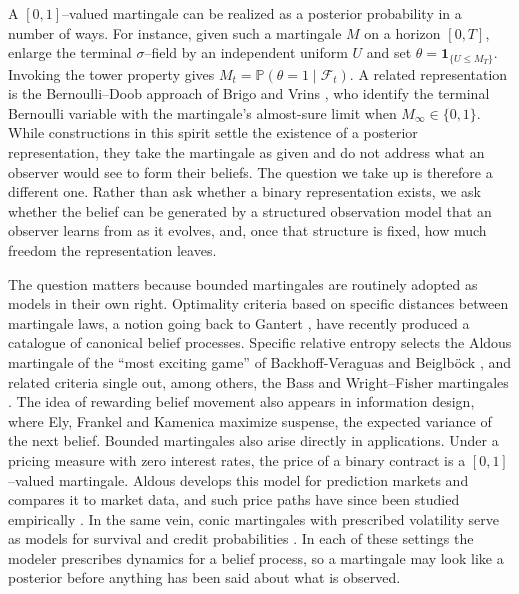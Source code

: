 \documentclass[11pt, reqno]{amsart}
\theoremstyle{plain}
\theoremstyle{remark}
\numberwithin{equation}{section}
\begin{document}
A $[0,1]$--valued martingale can be realized as a posterior probability in a number of ways. For instance, given such a martingale $M$ on a horizon $[0,T]$, enlarge the terminal $\sigma$--field by an independent uniform $U$ and set $\theta=\mathbf{1}_{\{U\le M_T\}}$. Invoking the tower property gives $M_t=\mathbb{P}(\theta=1\mid\mathcal{F}_t)$. A related representation is the Bernoulli–Doob approach of Brigo and Vrins \cite{brigovrin2026}, who identify the terminal Bernoulli variable with the martingale's almost-sure limit when $M_\infty\in\{0,1\}$. While constructions in this spirit settle the existence of a posterior representation, they take the martingale as given and do not address what an observer would see to form their beliefs. The question we take up is therefore a different one. Rather than ask whether a binary representation exists, we ask whether the belief can be generated by a structured observation model that an observer learns from as it evolves, and, once that structure is fixed, how much freedom the representation leaves.

The question matters because bounded martingales are routinely adopted as models in their own right. Optimality criteria based on specific distances between martingale laws, a notion going back to Gantert
\cite{gantert1991einige}, have recently produced a catalogue of canonical belief processes. Specific relative entropy selects the Aldous martingale of the ``most exciting game'' of Backhoff-Veraguas and Beiglb\"ock \cite{backhoff-beiglbock}, and related criteria single out, among others, the Bass and Wright--Fisher martingales 
\cite{backhoff2026reciprocal,backhoff2025bass,backhoff2026specific, guo2025randomness}. The idea of rewarding belief movement also appears in information design, where
Ely, Frankel and Kamenica \cite{ely2015suspense} maximize suspense, the
expected variance of the next belief. Bounded martingales also arise directly in applications. Under a pricing measure with zero interest rates, the price of a binary
contract is a $[0,1]$--valued martingale. 
Aldous \cite{aldous2013using}
develops this model for prediction markets and compares it to market data, and
such price paths have since been studied empirically \cite{augenblick2021belief}. In the same vein, conic martingales with prescribed volatility serve as models for survival and credit probabilities \cite{jeanblanc2018conic}. In each of these settings the modeler prescribes dynamics for a belief process, so a martingale may look like a posterior before anything has been said about what is observed.
\end{document}

